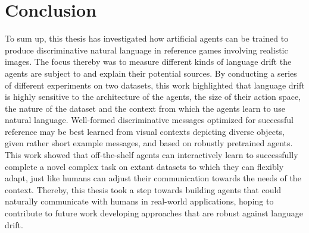 \section{Conclusion}
To sum up, this thesis has investigated how artificial agents can be trained to produce discriminative natural language in reference games involving realistic images. The focus thereby was to measure different kinds of language drift the agents are subject to and explain their potential sources. By conducting a series of different experiments on two datasets, this work highlighted that language drift is highly sensitive to the architecture of the agents, the size of their action space, the nature of the dataset and the context from which the agents learn to use natural language. Well-formed discriminative messages optimized for successful reference may be best learned from visual contexts depicting diverse objects, given rather short example messages, and based on robustly pretrained agents.  
This work showed that off-the-shelf agents can interactively learn to successfully complete a novel complex task on extant datasets to which they can flexibly adapt, just like humans can adjust their communication towards the needs of the context.
Thereby, this thesis took a step towards building agents that could naturally communicate with humans in real-world applications, hoping to contribute to future work developing approaches that are robust against language drift.